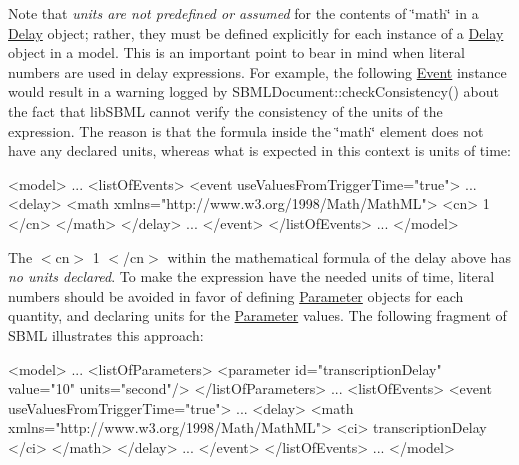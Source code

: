 Note that {\itshape units are not predefined or assumed} for the contents of \char`\"{}math\char`\"{} in a \hyperlink{class_delay}{Delay} object; rather, they must be defined explicitly for each instance of a \hyperlink{class_delay}{Delay} object in a model. This is an important point to bear in mind when literal numbers are used in delay expressions. For example, the following \hyperlink{class_event}{Event} instance would result in a warning logged by S\+B\+M\+L\+Document\+::check\+Consistency() about the fact that lib\+S\+B\+ML cannot verify the consistency of the units of the expression. The reason is that the formula inside the \char`\"{}math\char`\"{} element does not have any declared units, whereas what is expected in this context is units of time\+: \begin{DoxyVerb}<model>
    ...
    <listOfEvents>
        <event useValuesFromTriggerTime="true">
            ...
            <delay>
                <math xmlns="http://www.w3.org/1998/Math/MathML">
                    <cn> 1 </cn>
                </math>
            </delay>
            ...
        </event>
    </listOfEvents>
    ...
</model>
\end{DoxyVerb}


The {\ttfamily $<$cn$>$ 1 $<$/cn$>$} within the mathematical formula of the {\ttfamily delay} above has {\itshape no units declared}. To make the expression have the needed units of time, literal numbers should be avoided in favor of defining \hyperlink{class_parameter}{Parameter} objects for each quantity, and declaring units for the \hyperlink{class_parameter}{Parameter} values. The following fragment of S\+B\+ML illustrates this approach\+: \begin{DoxyVerb}<model>
    ...
    <listOfParameters>
        <parameter id="transcriptionDelay" value="10" units="second"/>
    </listOfParameters>
    ...
    <listOfEvents>
        <event useValuesFromTriggerTime="true">
            ...
            <delay>
                <math xmlns="http://www.w3.org/1998/Math/MathML">
                    <ci> transcriptionDelay </ci>
                </math>
            </delay>
            ...
        </event>
    </listOfEvents>
    ...
</model>
\end{DoxyVerb}


